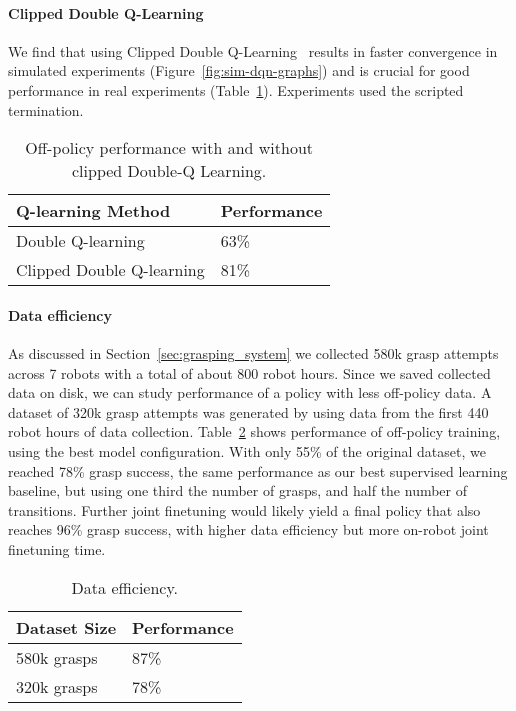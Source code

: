\documentclass{article}
\begin{document}
\paragraph{Clipped Double Q-Learning}
We find that using Clipped Double Q-Learning~\cite{td3} results in faster convergence in simulated experiments (Figure~\ref{fig:sim-dqn-graphs}) and is crucial for good performance in real experiments (Table~\ref{table:real-qlearn-ablation}). Experiments used the scripted termination.
\begin{table}[h]
\begin{center}
\begin{tabular}{|p{13em}|p{5em}|}
\hline
Q-learning Method & Performance  \\
\hline
Double Q-learning & 63\% \\ %
\hline
Clipped Double Q-learning & 81\% \\
\hline
\end{tabular}
\end{center}
\caption{Off-policy performance with and without clipped Double-Q Learning.}
\label{table:real-qlearn-ablation}
\vspace{-0.25in}
\end{table}\paragraph{Data efficiency}
As discussed in Section~\ref{sec:grasping_system} we collected 580k grasp attempts across 7 robots with a total of about 800 robot hours. Since we saved collected data on disk, we can study performance of a policy with less off-policy data. A dataset of 320k grasp attempts was generated by using data from the first 440 robot hours of data collection.
Table~\ref{tbl:real-data-efficiency} shows performance of off-policy training, using the best model configuration. With only 55\% of the original dataset, we reached 78\% grasp success, the same performance as our best supervised learning baseline, but using one third the number of grasps, and half the number of transitions. Further joint finetuning would likely yield a final policy that also reaches 96\% grasp success, with higher data efficiency but more on-robot joint finetuning time.
\begin{table}[h]
\begin{center}
\begin{tabular}{|p{7em}|p{5em}|}
\hline
Dataset Size & Performance  \\
\hline
580k grasps & 87\% \\
\hline
320k grasps & 78\% \\
\hline
\end{tabular}
\end{center}
\caption{Data efficiency.}
\label{tbl:real-data-efficiency}
\vspace{-0.25in}
\end{table}
\end{document}
